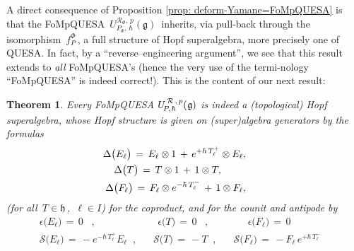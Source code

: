 \documentclass[12pt,reqno,twoside,a4paper]{amsart}
\numberwithin{equation}{section}
\newtheorem{theorem}[lema]{Theorem}
\theoremstyle{definition}
\newtheorem{free text}[lema]{}
\theoremstyle{remark}
\newcommand{\R}{{\mathcal R}}
\def \SS {\mathcal{S}}
\def \lieg{\mathfrak{g}}
\def \lieh{\mathfrak{h}}
\def \uRpPhg{U^{\,\R\,,\,p}_{\!P,\hskip0,7pt\hbar}(\hskip0,5pt\lieg)}
\theoremstyle{plain}
\begin{document}
\vskip9pt

   A direct consequence of  Proposition \ref{prop: deform-Yamane=FoMpQUESA}  is that the FoMpQUESA
   $ \, U_{\!P_\Phi,\,\hbar}^{\R_{\scriptscriptstyle \Phi},\,p}(\lieg) \, $
   inherits, via pull-back through the isomorphism  $ \, f^{\scriptscriptstyle \Phi}_{\scriptscriptstyle P} \, $,
   a full structure of Hopf superalgebra, more precisely one of QUESA.  In fact, by a ``reverse--engineering argument'',
   we see that this result extends to  \textsl{all\/}  FoMpQUESA's
   (hence the very use of the termi-{}\break{}nology ``FoMpQUESA'' is indeed correct!).
   This is the content of our next result:

\vskip11pt

\begin{theorem}  \label{thm: FoMpQUEA's}
%
 Every FoMpQUESA  $ \uRpPhg $  is indeed a (topological) Hopf superalgebra, whose Hopf structure
 is given on (super)algebra generators by the formulas
%
\begin{equation}  \label{eq: coprod_x_uRpPhg_2nd-time}
%
 \begin{aligned}
   \Delta \big(E_\ell\big)  \, = \,  E_\ell \otimes 1 \, + \, e^{+\hbar \, T_\ell^+} \otimes E_\ell,  \\
   \Delta\big(T\big)  \, = \,  T \otimes 1 \, + \, 1 \otimes T,   \hskip25pt  \\
   \Delta\big(F_\ell\big)  \, = \, F_\ell \otimes e^{-\hbar \, T_\ell^-} \, + \, 1 \otimes F_\ell,
%
 \end{aligned}   \qquad
%
\end{equation}
%
 (for all  $ \, T \in \lieh \, $,  $ \, \ell \in I $)  for the coproduct, and for the counit and antipode by
%
 \vskip-9pt
%
\begin{eqnarray}
%
   \epsilon\big(E_\ell\big) \, = \, 0  \;\;\; ,  \qquad  &  \;\quad
   \epsilon\big(T\big) \, = \, 0  \;\;\; ,  &  \;\qquad  \epsilon\big(F_\ell\big) \, = \, 0   \;\;\;\;\;\;\;   \label{eq: counit_x_uRpPhg}  \\
%
   \SS\big(E_\ell\big)  \, = \,  - e^{-\hbar \, T_\ell^+} E_\ell  \;\; ,  &  \;\;\;
   \SS\big(T\big)  \, = \,  - T   \;\; ,  &  \;\;\;  \SS\big(F_\ell\big)  \, = \,  - F_\ell \, e^{+\hbar \, T_\ell^-} \;\;\;   \label{eq: antipode_x_uRpPhg}
%
\end{eqnarray}
%
\end{theorem}
\end{document}
